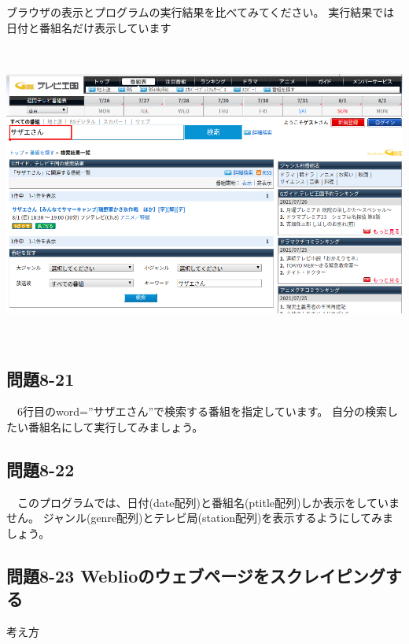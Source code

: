 \documentclass[a4paper,12pt,dvipdfmx]{jarticle}
\begin{document}
\bigskip


\bigskip

ブラウザの表示とプログラムの実行結果を比べてみてください。
実行結果では日付と番組名だけ表示しています

\begin{center}
\includegraphics[width=15.118cm,height=9.878cm]{textbook-img042.png}

\end{center}


\bigskip


\bigskip

\subsection*{}
\subsection*{問題8-21}
\ \ 6行目のword=”サザエさん”で検索する番組を指定しています。
自分の検索したい番組名にして実行してみましょう。

\subsection*{問題8-22}
\ \ このプログラムでは、日付(date配列)と番組名(ptitle配列)しか表示をしていません。
ジャンル(genre配列)とテレビ局(station配列)を表示するようにしてみましょう。

\clearpage\subsection*{問題8-23
Weblioのウェブページをスクレイピングする}
考え方
\end{document}

